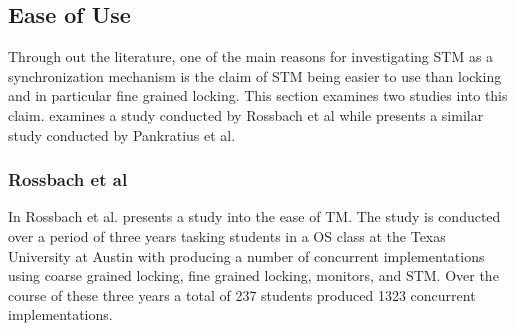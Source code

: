 %
%
%
%        
%
%
%	
%
%
%
\subsection{Ease of Use}
\label{sec:stm_ease_of_use}
Through out the literature, one of the main reasons for investigating \ac{STM} as a synchronization mechanism is the claim of \ac{STM} being easier to use than locking and in particular fine grained locking. This section examines two studies into this claim.  examines a study conducted by Rossbach et al while  presents a similar study conducted by Pankratius et al.
\subsubsection{Rossbach et al}
\label{sec:stm_ease_rossbach}
In \cite{rossbach2010transactional} Rossbach et al. presents a study into the ease of \ac{TM}. The study is conducted over a period of three years tasking students in a \ac{OS} class at the Texas University at Austin with producing a number of concurrent implementations using coarse grained locking, fine grained locking, monitors, and \ac{STM}. Over the course of these three years a total of 237 students produced 1323 concurrent implementations. 

